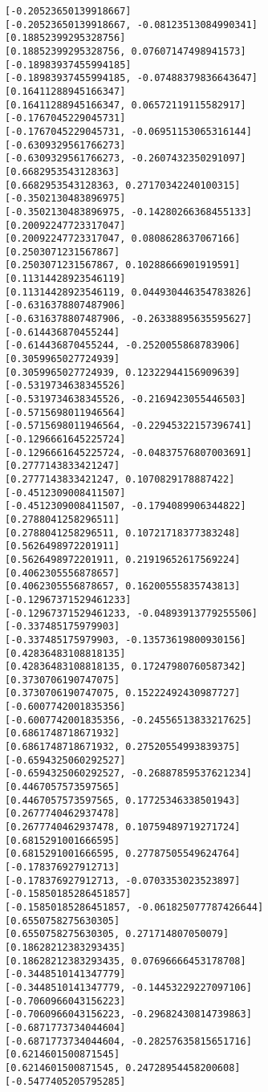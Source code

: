 \documentclass[11pt]{article}
\begin{document}
\begin{Verbatim}[commandchars=\\\{\}]
[-0.20523650139918667]
[-0.20523650139918667, -0.08123513084990341]
[0.18852399295328756]
[0.18852399295328756, 0.07607147498941573]
[-0.18983937455994185]
[-0.18983937455994185, -0.07488379836643647]
[0.16411288945166347]
[0.16411288945166347, 0.06572119115582917]
[-0.1767045229045731]
[-0.1767045229045731, -0.06951153065316144]
[-0.6309329561766273]
[-0.6309329561766273, -0.2607432350291097]
[0.6682953543128363]
[0.6682953543128363, 0.27170342240100315]
[-0.3502130483896975]
[-0.3502130483896975, -0.14280266368455133]
[0.20092247723317047]
[0.20092247723317047, 0.0808628637067166]
[0.2503071231567867]
[0.2503071231567867, 0.10288666901919591]
[0.11314428923546119]
[0.11314428923546119, 0.044930446354783826]
[-0.6316378807487906]
[-0.6316378807487906, -0.26338895635595627]
[-0.614436870455244]
[-0.614436870455244, -0.2520055868783906]
[0.3059965027724939]
[0.3059965027724939, 0.12322944156909639]
[-0.5319734638345526]
[-0.5319734638345526, -0.2169423055446503]
[-0.5715698011946564]
[-0.5715698011946564, -0.22945322157396741]
[-0.1296661645225724]
[-0.1296661645225724, -0.04837576807003691]
[0.2777143833421247]
[0.2777143833421247, 0.1070829178887422]
[-0.4512309008411507]
[-0.4512309008411507, -0.1794089906344822]
[0.2788041258296511]
[0.2788041258296511, 0.10721718377383248]
[0.5626498972201911]
[0.5626498972201911, 0.21919652617569224]
[0.4062305556878657]
[0.4062305556878657, 0.16200555835743813]
[-0.12967371529461233]
[-0.12967371529461233, -0.04893913779255506]
[-0.337485175979903]
[-0.337485175979903, -0.13573619800930156]
[0.42836483108818135]
[0.42836483108818135, 0.17247980760587342]
[0.3730706190747075]
[0.3730706190747075, 0.15222492430987727]
[-0.6007742001835356]
[-0.6007742001835356, -0.24556513833217625]
[0.6861748718671932]
[0.6861748718671932, 0.27520554993839375]
[-0.6594325060292527]
[-0.6594325060292527, -0.26887859537621234]
[0.4467057573597565]
[0.4467057573597565, 0.17725346338501943]
[0.2677740462937478]
[0.2677740462937478, 0.10759489719271724]
[0.6815291001666595]
[0.6815291001666595, 0.27787505549624764]
[-0.178376927912713]
[-0.178376927912713, -0.0703353023523897]
[-0.15850185286451857]
[-0.15850185286451857, -0.061825077787426644]
[0.6550758275630305]
[0.6550758275630305, 0.271714807050079]
[0.18628212383293435]
[0.18628212383293435, 0.07696666453178708]
[-0.3448510141347779]
[-0.3448510141347779, -0.14453229227097106]
[-0.7060966043156223]
[-0.7060966043156223, -0.29682430814739863]
[-0.6871773734044604]
[-0.6871773734044604, -0.28257635815651716]
[0.6214601500871545]
[0.6214601500871545, 0.24728954458200608]
[-0.5477405205795285]

\end{Verbatim}
\end{document}
